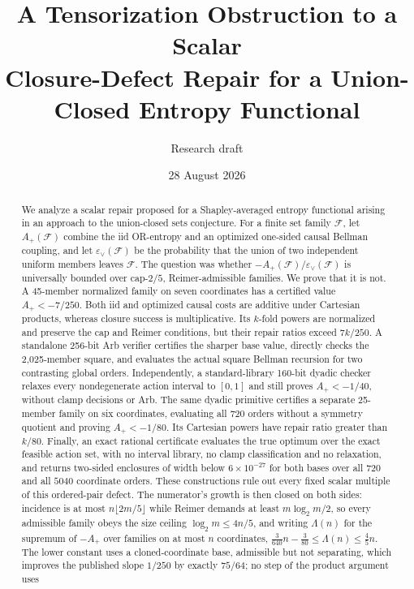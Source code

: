 \documentclass[11pt]{article}
\title{A Tensorization Obstruction to a Scalar\\
Closure-Defect Repair for a Union-Closed Entropy Functional}
\author{Research draft}
\date{28 August 2026}
\theoremstyle{remark}
\newcommand{\F}{\mathcal F}
\newcommand{\eps}{\varepsilon}
\begin{document}
\maketitle

\begin{abstract}
We analyze a scalar repair proposed for a Shapley-averaged entropy functional
arising in an approach to the union-closed sets conjecture.  For a finite set
family $\F$, let $A_+(\F)$ combine the iid OR-entropy and an optimized one-sided
causal Bellman coupling, and let $\eps_\vee(\F)$ be the probability that the
union of two independent uniform members leaves $\F$.  The question was
whether $-A_+(\F)/\eps_\vee(\F)$ is universally bounded over cap-$2/5$,
Reimer-admissible families.  We prove that it is not.  A 45-member normalized
family on seven coordinates has a certified value $A_+<-7/250$.  Both iid and
optimized causal costs are additive under Cartesian products, whereas closure
success is multiplicative.  Its $k$-fold powers are normalized and preserve
the cap and Reimer conditions, but their repair ratios exceed $7k/250$.
A standalone 256-bit Arb verifier certifies the sharper base value, directly
checks the 2,025-member square, and evaluates the actual square Bellman
recursion for two contrasting global orders.  Independently, a standard-library
160-bit dyadic checker relaxes every nondegenerate action interval to $[0,1]$
and still proves $A_+<-1/40$, without clamp decisions or Arb.  The same
dyadic primitive certifies a separate 25-member family on six coordinates,
evaluating all 720 orders without a symmetry quotient and proving
$A_+<-1/80$.  Its Cartesian powers have repair ratio greater than $k/80$.
Finally, an exact rational certificate evaluates the true optimum over the
exact feasible action set, with no interval library, no clamp classification
and no relaxation, and returns two-sided enclosures of width below
$6\times10^{-27}$ for both bases over all $720$ and all $5040$ coordinate
orders.
These constructions rule out every fixed scalar multiple of this
ordered-pair defect.  The numerator's growth is then closed on both sides:
incidence is at most $n\lfloor2m/5\rfloor$ while Reimer demands at least
$m\log_2m/2$, so every admissible family obeys the size ceiling
$\log_2m\le4n/5$, and writing $\Lambda(n)$ for the supremum of $-A_+$ over
families on at most $n$ coordinates,
$\tfrac3{640}n-\tfrac3{80}\le\Lambda(n)\le\tfrac45n$.  The lower constant uses a
cloned-coordinate base, admissible but not separating, which improves the
published slope $1/250$ by exactly $75/64$; no step of the product argument uses

\end{abstract}
\end{document}
